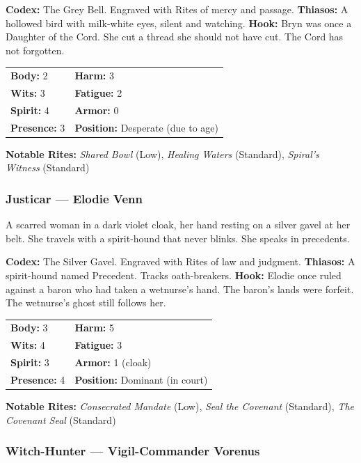 \textbf{Codex:} The Grey Bell. Engraved with Rites of mercy and passage.
\textbf{Thiasos:} A hollowed bird with milk-white eyes, silent and watching.
\textbf{Hook:} Bryn was once a Daughter of the Cord. She cut a thread she should not have cut. The Cord has not forgotten.

\begin{tabular}{ll}
\textbf{Body:} 2 & \textbf{Harm:} 3 \\
\textbf{Wits:} 3 & \textbf{Fatigue:} 2 \\
\textbf{Spirit:} 4 & \textbf{Armor:} 0 \\
\textbf{Presence:} 3 & \textbf{Position:} Desperate (due to age) \\
\end{tabular}

\textbf{Notable Rites:} \textit{Shared Bowl} (Low), \textit{Healing Waters} (Standard), \textit{Spiral's Witness} (Standard)

\subsubsection{Justicar — Elodie Venn}

A scarred woman in a dark violet cloak, her hand resting on a silver gavel at her belt. She travels with a spirit-hound that never blinks. She speaks in precedents.

\textbf{Codex:} The Silver Gavel. Engraved with Rites of law and judgment.
\textbf{Thiasos:} A spirit-hound named Precedent. Tracks oath-breakers.
\textbf{Hook:} Elodie once ruled against a baron who had taken a wetnurse's hand. The baron's lands were forfeit. The wetnurse's ghost still follows her.

\begin{tabular}{ll}
\textbf{Body:} 3 & \textbf{Harm:} 5 \\
\textbf{Wits:} 4 & \textbf{Fatigue:} 3 \\
\textbf{Spirit:} 3 & \textbf{Armor:} 1 (cloak) \\
\textbf{Presence:} 4 & \textbf{Position:} Dominant (in court) \\
\end{tabular}

\textbf{Notable Rites:} \textit{Consecrated Mandate} (Low), \textit{Seal the Covenant} (Standard), \textit{The Covenant Seal} (Standard)

\subsubsection{Witch-Hunter — Vigil-Commander Vorenus}

